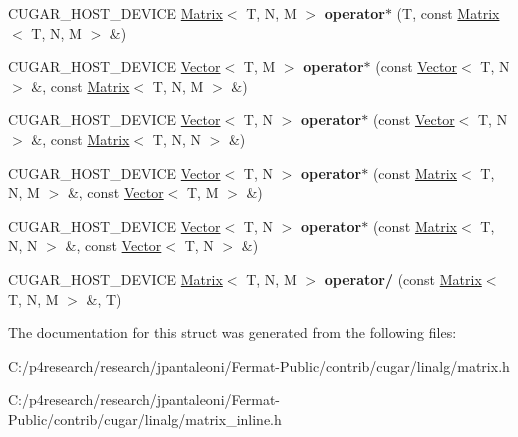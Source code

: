 \begin{DoxyCompactItemize}
\item 
\mbox{\label{structcugar_1_1_matrix_a1c5548e31c112dc489103960476615cf}} 
C\+U\+G\+A\+R\+\_\+\+H\+O\+S\+T\+\_\+\+D\+E\+V\+I\+CE \hyperlink{structcugar_1_1_matrix}{Matrix}$<$ T, N, M $>$ {\bfseries operator$\ast$} (T, const \hyperlink{structcugar_1_1_matrix}{Matrix}$<$ T, N, M $>$ \&)
\item 
\mbox{\label{structcugar_1_1_matrix_a07cb4751e9def1fa05a8e44f13bd6f55}} 
C\+U\+G\+A\+R\+\_\+\+H\+O\+S\+T\+\_\+\+D\+E\+V\+I\+CE \hyperlink{structcugar_1_1_vector}{Vector}$<$ T, M $>$ {\bfseries operator$\ast$} (const \hyperlink{structcugar_1_1_vector}{Vector}$<$ T, N $>$ \&, const \hyperlink{structcugar_1_1_matrix}{Matrix}$<$ T, N, M $>$ \&)
\item 
\mbox{\label{structcugar_1_1_matrix_afaf0e623fd02091ad2373ac929f1b457}} 
C\+U\+G\+A\+R\+\_\+\+H\+O\+S\+T\+\_\+\+D\+E\+V\+I\+CE \hyperlink{structcugar_1_1_vector}{Vector}$<$ T, N $>$ {\bfseries operator$\ast$} (const \hyperlink{structcugar_1_1_vector}{Vector}$<$ T, N $>$ \&, const \hyperlink{structcugar_1_1_matrix}{Matrix}$<$ T, N, N $>$ \&)
\item 
\mbox{\label{structcugar_1_1_matrix_a06c94cf407b260fef0ada3165edf408c}} 
C\+U\+G\+A\+R\+\_\+\+H\+O\+S\+T\+\_\+\+D\+E\+V\+I\+CE \hyperlink{structcugar_1_1_vector}{Vector}$<$ T, N $>$ {\bfseries operator$\ast$} (const \hyperlink{structcugar_1_1_matrix}{Matrix}$<$ T, N, M $>$ \&, const \hyperlink{structcugar_1_1_vector}{Vector}$<$ T, M $>$ \&)
\item 
\mbox{\label{structcugar_1_1_matrix_ab3bf9be2cfb34fb34d9e61c4f0988be2}} 
C\+U\+G\+A\+R\+\_\+\+H\+O\+S\+T\+\_\+\+D\+E\+V\+I\+CE \hyperlink{structcugar_1_1_vector}{Vector}$<$ T, N $>$ {\bfseries operator$\ast$} (const \hyperlink{structcugar_1_1_matrix}{Matrix}$<$ T, N, N $>$ \&, const \hyperlink{structcugar_1_1_vector}{Vector}$<$ T, N $>$ \&)
\item 
\mbox{\label{structcugar_1_1_matrix_a0986e82b9a1ee2e0acf80b5f2f1e6714}} 
C\+U\+G\+A\+R\+\_\+\+H\+O\+S\+T\+\_\+\+D\+E\+V\+I\+CE \hyperlink{structcugar_1_1_matrix}{Matrix}$<$ T, N, M $>$ {\bfseries operator/} (const \hyperlink{structcugar_1_1_matrix}{Matrix}$<$ T, N, M $>$ \&, T)
\end{DoxyCompactItemize}


The documentation for this struct was generated from the following files\+:\begin{DoxyCompactItemize}
\item 
C\+:/p4research/research/jpantaleoni/\+Fermat-\/\+Public/contrib/cugar/linalg/matrix.\+h\item 
C\+:/p4research/research/jpantaleoni/\+Fermat-\/\+Public/contrib/cugar/linalg/matrix\+\_\+inline.\+h\end{DoxyCompactItemize}
